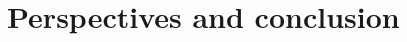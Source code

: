 \documentclass[11pt, 			%
               twoside,         %
			  ]{report}
\begin{document}


\chapter{Perspectives and conclusion}







\end{document}
